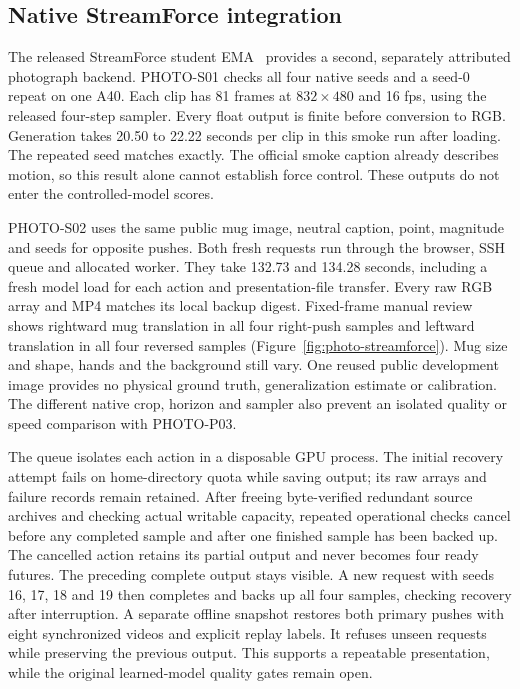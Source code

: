 \documentclass[11pt,a4paper]{article}
\begin{document}
\subsection{Native StreamForce integration}
\label{sec:photo-streamforce}
The released StreamForce student EMA~\cite{streamforce} provides a second,
separately attributed photograph backend. PHOTO-S01 checks all four native
seeds and a seed-0 repeat on one A40. Each clip has 81 frames at $832\times480$
and 16 fps, using the released four-step sampler. Every float output is finite
before conversion to RGB. Generation takes 20.50 to 22.22 seconds per clip in
this smoke run after loading. The repeated seed matches exactly. The official
smoke caption already describes motion, so this result alone cannot establish
force control. These outputs do not enter the controlled-model scores.

PHOTO-S02 uses the same public mug image, neutral caption, point, magnitude
and seeds for opposite pushes. Both fresh requests run through the browser,
SSH queue and allocated worker. They take 132.73 and 134.28 seconds, including
a fresh model load for each action and presentation-file transfer. Every raw
RGB array and MP4 matches its local backup digest. Fixed-frame manual review
shows rightward mug translation in all four right-push samples and leftward
translation in all four reversed samples (Figure~\ref{fig:photo-streamforce}).
Mug size and shape, hands and the background still vary. One reused public
development image provides no physical ground truth, generalization estimate
or calibration. The different native crop, horizon and sampler also prevent
an isolated quality or speed comparison with PHOTO-P03.

The queue isolates each action in a disposable GPU process. The initial
recovery attempt fails on home-directory quota while saving output; its raw
arrays and failure records remain retained. After freeing byte-verified
redundant source archives and checking actual writable capacity, repeated
operational
checks cancel before any completed sample and after one finished sample has
been backed up. The cancelled action retains its partial output and never
becomes four ready futures. The preceding complete output stays visible.
A new request with seeds 16, 17, 18 and 19 then completes and backs up all four samples,
checking recovery after interruption. A separate offline snapshot restores
both primary pushes with eight synchronized videos and explicit replay labels.
It refuses unseen requests while preserving the previous output. This supports
a repeatable presentation, while the original learned-model quality gates
remain open.
\end{document}
